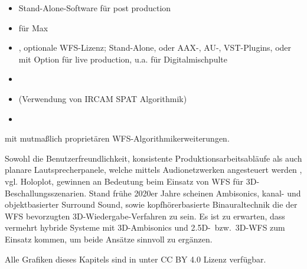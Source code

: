 \begin{itemize}
\item \cite{url:panoramix} Stand-Alone-Software für post production
\item \cite{url:spat_revolution} für Max %
\item \cite{url:flux_spat_revolution}, optionale WFS-Lizenz; Stand-Alone, oder AAX-, AU-, VST-Plugins, oder mit Option für live production, u.a. für Digitalmischpulte %
\item \cite{url:iosono} %
\item \cite{url:amadeus_holophonix} (Verwendung von IRCAM SPAT Algorithmik) %
\item \cite{url:holoplot} %
\end{itemize}
mit mutmaßlich proprietären WFS-Algorithmikerweiterungen.



Sowohl die Benutzerfreundlichkeit,
konsistente Produktionsarbeitsabläufe als auch planare Lautsprecherpanele,
welche mittels Audionetzwerken angesteuert werden \cite{Reussner2013_JAES},
vgl. Holoplot, gewinnen an Bedeutung beim Einsatz von WFS für 3D-Beschallungsszenarien.
%
Stand frühe 2020er Jahre scheinen Ambisonics, kanal- und objektbasierter Surround Sound,
sowie kopfhörerbasierte Binauraltechnik
die der WFS bevorzugten 3D-Wiedergabe-Verfahren zu sein.
%
Es ist zu erwarten, dass vermehrt hybride Systeme mit 3D-Ambisonics und 2.5D-~bzw.~3D-WFS
zum Einsatz kommen, um beide Ansätze sinnvoll zu ergänzen.



\vspace{\baselineskip}Alle Grafiken dieses Kapitels sind in \cite{SchultzHahnSpors2023} unter CC BY 4.0 Lizenz verfügbar.
